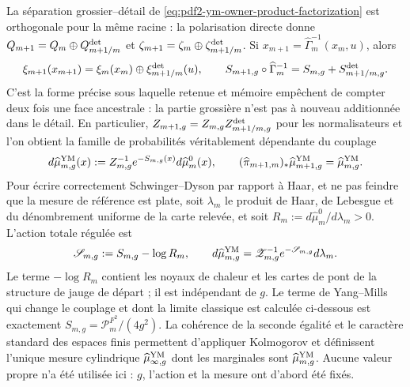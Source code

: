La séparation grossier--détail de \eqref{eq:pdf2-ym-owner-product-factorization} est orthogonale pour la même racine : la polarisation directe donne $Q_{m+1}=Q_m\oplus Q_{m+1/m}^{\rm det}$ et $\zeta_{m+1}=\zeta_m\oplus\zeta_{m+1/m}^{\rm det}$. Si $x_{m+1}=\widehat\Gamma_m^{-1}(x_m,u)$, alors
\begin{equation}\label{eq:pdf2-ym-action-cocycle}
 \xi_{m+1}(x_{m+1})
 =\xi_m(x_m)\oplus\xi_{m+1/m}^{\rm det}(u),
 \qquad
 S_{m+1,g}\circ\widehat\Gamma_m^{-1}
 =S_{m,g}+S_{m+1/m,g}^{\rm det}.
\end{equation}
C'est la forme précise sous laquelle retenue et mémoire empêchent de compter deux fois une face ancestrale : la partie grossière n'est pas à nouveau additionnée dans le détail. En particulier, $Z_{m+1,g}=Z_{m,g}Z_{m+1/m,g}^{\rm det}$ pour les normalisateurs et l'on obtient la famille de probabilités véritablement dépendante du couplage
\begin{equation}\label{eq:pdf2-ym-gibbs-measure}
 d\widehat\mu_{m,g}^{\rm YM}(x)
 :=Z_{m,g}^{-1}e^{-S_{m,g}(x)}d\widehat\mu_m^0(x),
 \qquad
 (\widehat\pi_{m+1,m})_*\widehat\mu_{m+1,g}^{\rm YM}
 =\widehat\mu_{m,g}^{\rm YM}.
\end{equation}
Pour écrire correctement Schwinger--Dyson par rapport à Haar, et ne pas feindre que la
mesure de référence est plate, soit $\lambda_m$ le produit de Haar, de Lebesgue et du
dénombrement uniforme de la carte relevée, et soit
$R_m:=d\widehat\mu_m^0/d\lambda_m>0$. L’action totale régulée est
\begin{equation}\label{eq:pdf2-ym-total-regulated-action}
 \mathscr S_{m,g}:=S_{m,g}-\log R_m,
 \qquad
 d\widehat\mu_{m,g}^{\rm YM}
 =\mathscr Z_{m,g}^{-1}e^{-\mathscr S_{m,g}}d\lambda_m.
\end{equation}
Le terme $-\log R_m$ contient les noyaux de chaleur et les cartes de pont de la
structure de jauge de départ ; il est indépendant de $g$. Le terme de Yang--Mills qui
change le couplage et dont la limite classique est calculée ci-dessous est exactement
$S_{m,g}=\mathcal P_m^{F^2}/(4g^2)$.
La cohérence de la seconde égalité et le caractère standard des espaces finis
permettent d’appliquer Kolmogorov et définissent l’unique mesure cylindrique
$\widehat\mu_{\infty,g}^{\rm YM}$ dont les marginales sont
$\widehat\mu_{m,g}^{\rm YM}$.
Aucune valeur propre n’a été utilisée ici : $g$, l’action et
la mesure ont d’abord été fixés.

